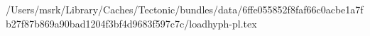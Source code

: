 /Users/msrk/Library/Caches/Tectonic/bundles/data/6ffe055852f8faf66c0acbe1a7fb27f87b869a90bad1204f3bf4d9683f597c7c/loadhyph-pl.tex